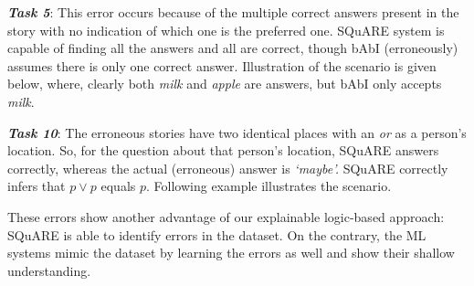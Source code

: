 \documentclass[letterpaper]{article}
\begin{document}
\noindent
\textit{\textbf{Task 5}}: This error occurs because of the multiple correct answers present in the story
with no indication of which one is the preferred one.
SQuARE system is capable of finding all the answers and all are correct, though bAbI (erroneously) assumes there is only one  correct answer. Illustration of the scenario is given below, where, clearly both \textit{milk} and \textit{apple} are answers, but bAbI only accepts \textit{milk}.

\smallskip
\noindent
\cprotect {}

\medskip
\noindent\textit{\textbf{Task 10}}: The erroneous stories have two identical places with an \textit{or} as a person's location. So, for the question about that person's location, SQuARE answers correctly, whereas the actual (erroneous) answer is \textit{`maybe'.} SQuARE correctly infers that $p \vee p$ equals $p$. Following example illustrates the scenario.

\smallskip\noindent
\cprotect {}

\smallskip
\noindent
These errors show another advantage of our  explainable logic-based approach: SQuARE is able to identify errors in the dataset. On the contrary, the ML systems mimic the dataset by learning the errors as well and show their shallow understanding.
\end{document}

